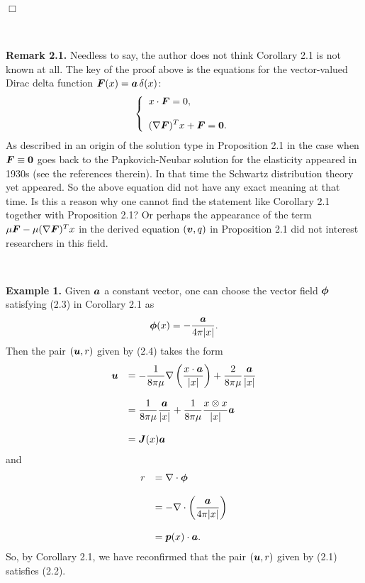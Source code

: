 \noindent
$\Box$

$\quad$

{\bf\noindent Remark 2.1.}
Needless to say, the author does not think Corollary 2.1 is not known at all.
The key of the proof above is the equations for the vector-valued  Dirac delta function 
$\mbox{\boldmath $F$}(x)=\mbox{\boldmath $a$}\,\delta(x)$:
$$\left\{\begin{array}{l}
\displaystyle
x\cdot\mbox{\boldmath $F$}=0,\\
\\
\displaystyle
(\nabla\mbox{\boldmath $F$})^Tx+\mbox{\boldmath $F$}=\mbox{\boldmath $0$}.
\end{array}
\right.
$$
As described in \cite{TCB} an origin of the solution type in Proposition 2.1 in the case when $\mbox{\boldmath $F$}\equiv\mbox{\boldmath $0$}$ goes back to the Papkovich-Neubar solution for the elasticity appeared in 1930s
(see the references therein).
In that time the Schwartz distribution theory yet appeared.  So the above equation did not have any 
exact meaning at that time.  Is this a reason
why one cannot find the statement like Corollary 2.1 together with 
Proposition 2.1? 
Or perhaps the appearance of the term $\mu\mbox{\boldmath $F$}-\mu(\nabla\mbox{\boldmath $F$})^Tx$
in the derived equation $(\mbox{\boldmath $v$},q)$ in Proposition 2.1 did not interest researchers in this field.




$\quad$


{\bf\noindent Example 1.}
Given  $\mbox{\boldmath $a$}$ a constant vector,
one can choose the vector field $\mbox{\boldmath $\phi$}$ satisfying (2.3) in Corollary 2.1 as
$$\displaystyle
\mbox{\boldmath $\phi$}(x)=-\frac{\mbox{\boldmath $a$}}{4\pi\vert x\vert}.
$$
Then the pair $(\mbox{\boldmath $u$},r)$ given by (2.4) takes the form
$$\begin{array}{ll}
\displaystyle
\mbox{\boldmath $u$}
&
\displaystyle
=-\frac{1}{8\pi\mu}\nabla\left(\frac{x\cdot\mbox{\boldmath $a$}}{\vert x\vert}\right)+\frac{2}{8\pi\mu}\frac{\mbox{\boldmath $a$}}{\vert x\vert}
\\
\\
\displaystyle
&
\displaystyle
=\frac{1}{8\pi\mu}\frac{\mbox{\boldmath $a$}}{\vert x\vert}
+\frac{1}{8\pi\mu}\frac{x\otimes x}{\vert x\vert}\mbox{\boldmath $a$}
\\
\\
\displaystyle
&
\displaystyle
=\mbox{\boldmath $J$}(x)\mbox{\boldmath $a$}
\end{array}
$$
and
$$\begin{array}{ll}
\displaystyle
r
&
\displaystyle
=\nabla\cdot\mbox{\boldmath $\phi$}
\\
\\
\displaystyle
&
\displaystyle
=
-\nabla\cdot\left(\frac{\mbox{\boldmath $a$}}{4\pi\vert x\vert}\right)
\\
\\
\displaystyle
&
\displaystyle
=\mbox{\boldmath $p$}(x)\cdot\mbox{\boldmath $a$}.
\end{array}
$$
So, by Corollary 2.1, we have reconfirmed that the pair $(\mbox{\boldmath $u$}, r)$ given by  (2.1) satisfies (2.2).




